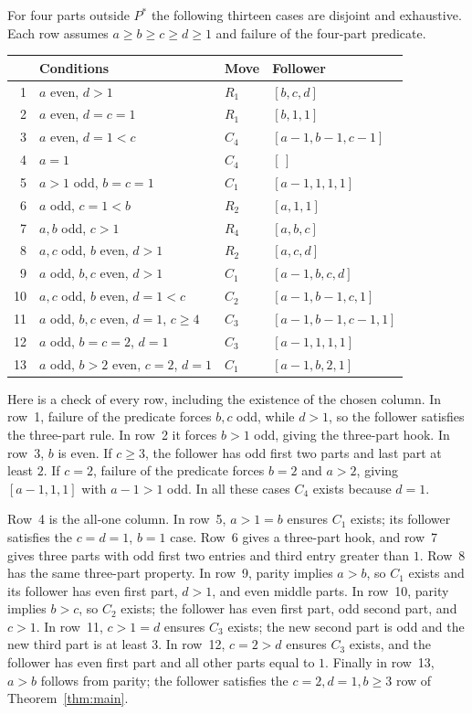 \documentclass[11pt]{article}
\begin{document}
For four parts outside $P^*$ the following thirteen cases are disjoint
and exhaustive. Each row assumes $a\ge b\ge c\ge d\ge1$ and failure of
the four-part predicate.
\begin{center}
\small
\begin{tabular}{rlll}
\toprule
 & Conditions & Move & Follower\\
\midrule
1 & $a$ even, $d>1$ & $R_1$ & $[b,c,d]$\\
2 & $a$ even, $d=c=1$ & $R_1$ & $[b,1,1]$\\
3 & $a$ even, $d=1<c$ & $C_4$ & $[a-1,b-1,c-1]$\\
4 & $a=1$ & $C_4$ & $[\,]$\\
5 & $a>1$ odd, $b=c=1$ & $C_1$ & $[a-1,1,1,1]$\\
6 & $a$ odd, $c=1<b$ & $R_2$ & $[a,1,1]$\\
7 & $a,b$ odd, $c>1$ & $R_4$ & $[a,b,c]$\\
8 & $a,c$ odd, $b$ even, $d>1$ & $R_2$ & $[a,c,d]$\\
9 & $a$ odd, $b,c$ even, $d>1$ & $C_1$ & $[a-1,b,c,d]$\\
10 & $a,c$ odd, $b$ even, $d=1<c$ & $C_2$ & $[a-1,b-1,c,1]$\\
11 & $a$ odd, $b,c$ even, $d=1$, $c\ge4$ & $C_3$ & $[a-1,b-1,c-1,1]$\\
12 & $a$ odd, $b=c=2$, $d=1$ & $C_3$ & $[a-1,1,1,1]$\\
13 & $a$ odd, $b>2$ even, $c=2$, $d=1$ & $C_1$ & $[a-1,b,2,1]$\\
\bottomrule
\end{tabular}
\end{center}
Here is a check of every row, including the existence of the chosen column.
In row~1, failure of the predicate forces $b,c$ odd, while $d>1$,
so the follower satisfies the three-part rule.
In row~2 it forces $b>1$ odd, giving the three-part hook.
In row~3, $b$ is even. If $c\ge3$, the follower has odd first two parts
and last part at least $2$. If $c=2$, failure of the predicate forces
$b=2$ and $a>2$, giving $[a-1,1,1]$ with $a-1>1$ odd.
In all these cases $C_4$ exists because $d=1$.

Row~4 is the all-one column.
In row~5, $a>1=b$ ensures $C_1$ exists; its follower satisfies the
$c=d=1$, $b=1$ case.
Row~6 gives a three-part hook, and row~7 gives three parts with
odd first two entries and third entry greater than $1$.
Row~8 has the same three-part property.
In row~9, parity implies $a>b$, so $C_1$ exists and its follower
has even first part, $d>1$, and even middle parts.
In row~10, parity implies $b>c$, so $C_2$ exists;
the follower has even first part, odd second part, and $c>1$.
In row~11, $c>1=d$ ensures $C_3$ exists; the new second part
is odd and the new third part is at least $3$.
In row~12, $c=2>d$ ensures $C_3$ exists, and the follower has
even first part and all other parts equal to $1$.
Finally in row~13, $a>b$ follows from parity; the follower satisfies
the $c=2,d=1,b\ge3$ row of Theorem~\ref{thm:main}.
\end{document}
